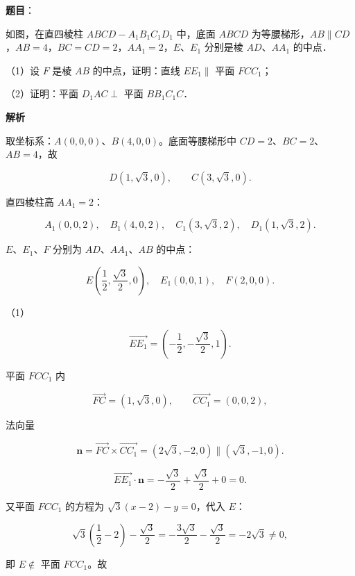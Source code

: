 \begin{answer}

\textbf{题目}：

如图，在直四棱柱 $ABCD-A_1B_1C_1D_1$ 中，底面 $ABCD$ 为等腰梯形，$AB\parallel CD$，$AB=4$，$BC=CD=2$，$AA_1=2$，$E$、$E_1$ 分别是棱 $AD$、$AA_1$ 的中点．
\nopagebreak[4]
\begin{center}\end{center}
\nopagebreak[4]
（1）设 $F$ 是棱 $AB$ 的中点，证明：直线 $EE_1\parallel$ 平面 $FCC_1$；

（2）证明：平面 $D_1AC\perp$ 平面 $BB_1C_1C$．

\textbf{解析}

取坐标系：$A(0,0,0)$、$B(4,0,0)$。底面等腰梯形中 $CD=2$、$BC=2$、$AB=4$，故

\nopagebreak[4]
\[D(1,\sqrt3,0),\qquad C(3,\sqrt3,0).\]

直四棱柱高 $AA_1=2$：

\nopagebreak[4]
\[A_1(0,0,2),\quad B_1(4,0,2),\quad C_1(3,\sqrt3,2),\quad D_1(1,\sqrt3,2).\]

$E$、$E_1$、$F$ 分别为 $AD$、$AA_1$、$AB$ 的中点：

\nopagebreak[4]
\[E\left(\frac12,\frac{\sqrt3}{2},0\right),\quad E_1(0,0,1),\quad F(2,0,0).\]

（1）

\nopagebreak[4]
\[\overrightarrow{EE_1}=\left(-\frac12,-\frac{\sqrt3}{2},1\right).\]

平面 $FCC_1$ 内

\nopagebreak[4]
\[\overrightarrow{FC}=(1,\sqrt3,0),\qquad \overrightarrow{CC_1}=(0,0,2),\]

法向量

\nopagebreak[4]
\[\boldsymbol n=\overrightarrow{FC}\times\overrightarrow{CC_1}
=(2\sqrt3,-2,0)\parallel(\sqrt3,-1,0).\]

\nopagebreak[4]
\[\overrightarrow{EE_1}\cdot\boldsymbol n=-\frac{\sqrt3}{2}+\frac{\sqrt3}{2}+0=0 .\]

又平面 $FCC_1$ 的方程为 $\sqrt3(x-2)-y=0$，代入 $E$：

\nopagebreak[4]
\[\sqrt3\left(\frac12-2\right)-\frac{\sqrt3}{2}=-\frac{3\sqrt3}{2}-\frac{\sqrt3}{2}=-2\sqrt3\neq0,\]

即 $E\notin$ 平面 $FCC_1$。故


\end{answer}
